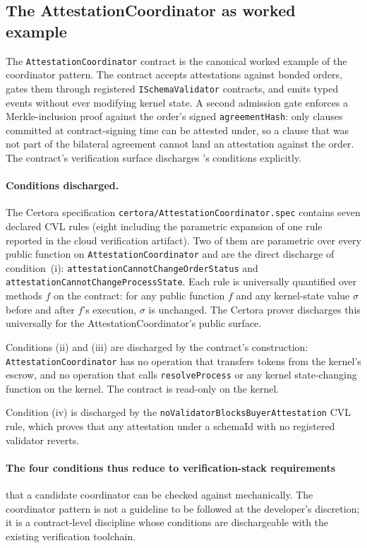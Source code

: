 \documentclass[11pt,a4paper]{article}
\theoremstyle{definition}
\theoremstyle{remark}
\begin{document}
\subsection{The AttestationCoordinator as worked example}

The \texttt{AttestationCoordinator} contract is the canonical worked
example of the coordinator pattern. The contract accepts attestations
against bonded orders, gates them through registered
\texttt{ISchemaValidator} contracts, and emits typed events without
ever modifying kernel state. A second admission gate enforces a
Merkle-inclusion proof against the order's signed
\texttt{agreementHash}: only clauses committed at contract-signing
time can be attested under, so a clause that was not part of the
bilateral agreement cannot land an attestation against the order.
The contract's verification surface discharges
's conditions explicitly.

\paragraph{Conditions discharged.}
The Certora specification \texttt{certora/AttestationCoordinator.spec}
contains seven declared CVL rules (eight including the parametric
expansion of one rule reported in the cloud verification artifact).
Two of them are parametric over every
public function on \texttt{AttestationCoordinator} and are the
direct discharge of condition~(i):
\texttt{attestationCannotChangeOrderStatus} and
\texttt{attestationCannotChangeProcessState}. Each rule is
universally quantified over methods $f$ on the contract: for any
public function $f$ and any kernel-state value $\sigma$ before and
after $f$'s execution, $\sigma$ is unchanged. The Certora prover
discharges this universally for the AttestationCoordinator's public
surface.

Conditions (ii) and (iii) are discharged by the contract's
construction: \texttt{AttestationCoordinator} has no operation that
transfers tokens from the kernel's escrow, and no operation that
calls \texttt{resolveProcess} or any kernel state-changing function
on the kernel. The contract is read-only on the kernel.

Condition (iv) is discharged by the
\texttt{noValidatorBlocksBuyerAttestation} CVL rule, which proves
that any attestation under a schemaId with no registered validator
reverts.

\paragraph{The four conditions thus reduce to verification-stack
requirements} that a candidate coordinator can be checked against
mechanically. The coordinator pattern is not a guideline to be
followed at the developer's discretion; it is a contract-level
discipline whose conditions are dischargeable with the existing
verification toolchain.
\end{document}
